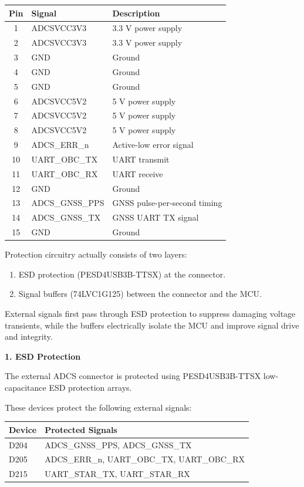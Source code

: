 \documentclass[10pt]{../datasheet}
\begin{document}
\begin{center}
\begin{tabular}{c l l}
\hline
\textbf{Pin} & \textbf{Signal} & \textbf{Description} \\
\hline
1  & ADCSVCC3V3       & 3.3 V power supply \\
2  & ADCSVCC3V3       & 3.3 V power supply \\
3  & GND              & Ground \\
4  & GND              & Ground \\
5  & GND              & Ground \\
6  & ADCSVCC5V2       & 5 V power supply \\
7  & ADCSVCC5V2       & 5 V power supply \\
8  & ADCSVCC5V2       & 5 V power supply \\
9  & ADCS\_ERR\_n     & Active-low error signal \\
10 & UART\_OBC\_TX    & UART transmit \\
11 & UART\_OBC\_RX    & UART receive \\
12 & GND              & Ground \\
13 & ADCS\_GNSS\_PPS  & GNSS pulse-per-second timing \\
14 & ADCS\_GNSS\_TX   & GNSS UART TX signal \\
15 & GND              & Ground \\
\hline
\end{tabular}
\end{center}

Protection circuitry actually consists of two layers:
\begin{enumerate}
    \item ESD protection (PESD4USB3B-TTSX) at the connector.
    \item Signal buffers (74LVC1G125) between the connector and the MCU.
\end{enumerate}

External signals first pass through ESD protection to suppress damaging voltage transients, while the buffers electrically isolate the MCU and improve signal drive and integrity.

\textbf{1. ESD Protection}

The external ADCS connector is protected using PESD4USB3B-TTSX low-capacitance ESD protection arrays.

These devices protect the following external signals:

\begin{center}
\begin{tabular}{l l}
\hline
\textbf{Device} & \textbf{Protected Signals} \\
\hline
D204 & ADCS\_GNSS\_PPS, ADCS\_GNSS\_TX \\
D205 & ADCS\_ERR\_n, UART\_OBC\_TX, UART\_OBC\_RX \\
D215 & UART\_STAR\_TX, UART\_STAR\_RX \\
\hline
\end{tabular}
\end{center}
\end{document}
